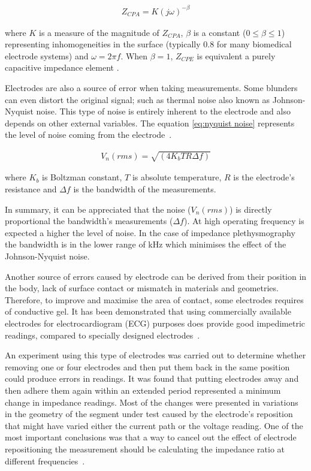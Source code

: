 \begin{align}
\label{eq:zcpa}
Z_{CPA} = K(j\omega)^{-\beta}
\end{align}

where $K$ is a measure of the magnitude of $Z_{CPA}$, $\beta$ is a constant ($0 \leq \beta \leq 1$) representing inhomogeneities in the surface (typically \num{0.8} for many biomedical electrode systems) and $\omega = 2\pi f$. When $\beta = 1$, $Z_{CPE}$ is equivalent a purely capacitive impedance element \cite{franks2005impedance,mcadams2006characterization,mcadams1995linear}.

Electrodes are also a source of error when taking measurements. Some blunders can even distort the original signal; such as thermal noise also known as Johnson-Nyquist noise. This type of noise is entirely inherent to the electrode and also depends on other external variables.  The equation \ref{eq:nyquist noise} represents the level of noise coming from the electrode~\cite{mcadams1995linear}.

\begin{align}
\label{eq:nyquist noise}
V_n(rms)=\sqrt{(4 K_b T R \Delta f)}
\end{align}

where $K_b$ is Boltzman constant, $T$ is absolute temperature, $R$ is the electrode’s resistance and $\Delta f$ is the bandwidth of the measurements. 

In summary, it can be appreciated that the noise ($V_n(rms)$) is directly proportional the bandwidth’s measurements ($\Delta f$). At high operating frequency is expected a higher the level of noise. In the case of impedance plethysmography the bandwidth is in the lower range of \si{\kilo\hertz} which minimises the effect of the Johnson-Nyquist noise.

Another source of errors caused by electrode can be derived from their position in the body, lack of surface contact or mismatch in materials and geometries. Therefore, to improve and maximise the area of contact, some electrodes requires of conductive gel. It has been demonstrated that using commercially available electrodes for electrocardiogram (ECG) purposes does provide good impedimetric readings, compared to specially designed electrodes~\cite{caicedo2012use}.

An experiment using this type of electrodes was carried out to determine whether removing one or four electrodes and then put them back in the same position could produce errors in readings. It was found that putting electrodes away and then adhere them again within an extended period represented a minimum change in impedance readings. Most of the changes were presented in variations in the geometry of the segment under test caused by the electrode's reposition that might have varied either the current path or the voltage reading. One of the most important conclusions was that a way to cancel out the effect of electrode repositioning the measurement should be calculating the impedance ratio at different frequencies~\cite{lozano1997electrode}.

